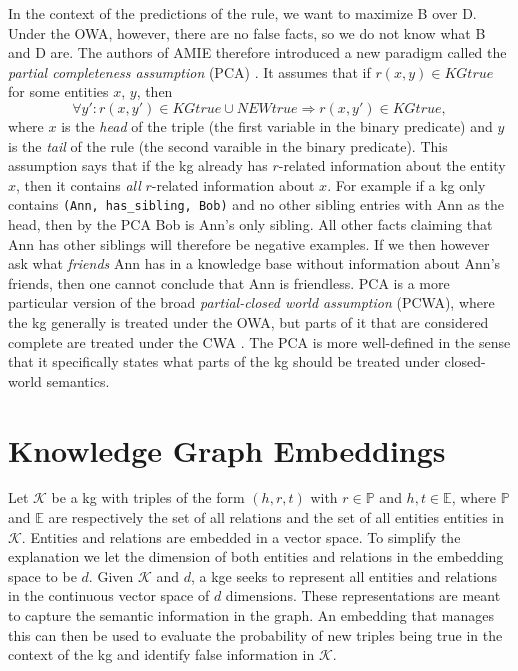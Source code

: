 In the context of the predictions of the rule, we want to maximize B over D. Under the OWA, however, there are no false facts, so we do not know what B and D are. The authors of AMIE therefore introduced a new paradigm called the \textit{partial completeness assumption} (PCA) \cite{amie}. It assumes that if $r(x, y) \in KG true$ for some entities $x$, $y$, then
\[\forall y' : r(x, y') \in KGtrue \cup NEWtrue \Rightarrow r(x, y') \in KGtrue,\]
where $x$ is the \textit{head} of the triple (the first variable in the binary predicate) and $y$ is the \textit{tail} of the rule (the second varaible in the binary predicate).
This assumption says that if the \gls{kg} already has $r$-related information about the entity $x$,  then it contains \textit{all} $r$-related information about $x$. For example if a \gls{kg} only contains \texttt{(Ann, has\_sibling, Bob)} and no other sibling entries with Ann as the head, then by the PCA Bob is Ann's only sibling. All other facts claiming that Ann has other siblings will therefore be negative examples. If we then however ask what \textit{friends} Ann has in a knowledge base without information about Ann's friends, then one cannot conclude that Ann is friendless. PCA is a more particular version of the broad \textit{partial-closed world assumption} (PCWA), where the \gls{kg} generally is treated under the OWA, but parts of it that are considered complete are treated under the CWA \cite{motro1989integrity}. The PCA is more well-defined in the sense that it specifically states what parts of the \gls{kg} should be treated under closed-world semantics.

\section{Knowledge Graph Embeddings}
\label{KG_embeddings}
Let $\mathcal{K}$ be a \gls{kg} with triples of the form $(h, r, t)$ with $r\in \mathbb{P}$ and $h, t \in \mathbb{E}$, where $\mathbb{P}$ and $\mathbb{E}$ are respectively the set of all relations and the set of all entities entities in $\mathcal{K}$. Entities and relations are embedded in a vector space. To simplify the explanation we let the dimension of both entities and relations in the embedding space to be $d$.
Given $\mathcal{K}$ and $d$, a \gls{kge} seeks to represent all entities and relations in the continuous vector space of $d$ dimensions. These representations are meant to capture the semantic information in the graph. An embedding that manages this can then be used to evaluate the probability of new triples being true in the context of the \gls{kg} and identify false information in $\mathcal{K}$.%

